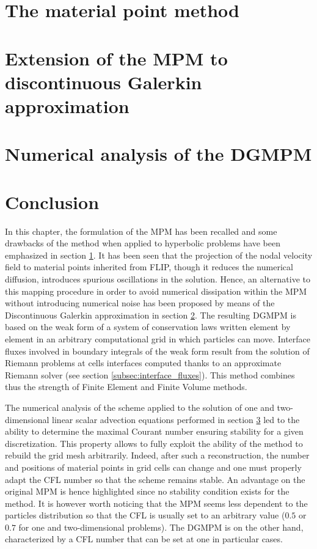 \section{The material point method}
\label{sec:MPM}


\section{Extension of the MPM to discontinuous Galerkin approximation}
\label{sec:DGMPM}


\section{Numerical analysis of the DGMPM}
\label{sec:DGMPM_analysis}


\section*{Conclusion}
In this chapter, the formulation of the MPM has been recalled and some drawbacks of the method when applied to hyperbolic problems have been emphasized in section \ref{sec:MPM}. It has been seen that the projection of the nodal velocity field to material points inherited from FLIP, though it reduces the numerical diffusion, introduces spurious oscillations in the solution. Hence, an alternative to this mapping procedure in order to avoid numerical dissipation within the MPM without introducing numerical noise has been proposed by means of the Discontinuous Galerkin approximation in section \ref{sec:DGMPM}. The resulting DGMPM is based on the weak form of a system of conservation laws written element by element in an arbitrary computational grid in which particles can move. Interface fluxes involved in boundary integrals of the weak form result from the solution of Riemann problems at cells interfaces computed thanks to an approximate Riemann solver (see section \ref{subsec:interface_fluxes}). This method combines thus the strength of Finite Element and Finite Volume methods.

The numerical analysis of the scheme applied to the solution of one and two-dimensional linear scalar advection equations performed in section \ref{sec:DGMPM_analysis} led to the ability to determine the maximal Courant number ensuring stability for a given discretization.
This property allows to fully exploit the ability of the method to rebuild the grid mesh arbitrarily. Indeed, after such a reconstruction, the number and positions of material points in grid cells can change and one must properly adapt the CFL number so that the scheme remains stable. An advantage on the original MPM is hence highlighted since no stability condition exists for the method. It is however worth noticing that the MPM seems less dependent to the particles distribution so that the CFL is usually set to an arbitrary value ($0.5$ or $0.7$ for one and two-dimensional problems).
The DGMPM is on the other hand, characterized by a CFL number that can be set at one in particular cases.

